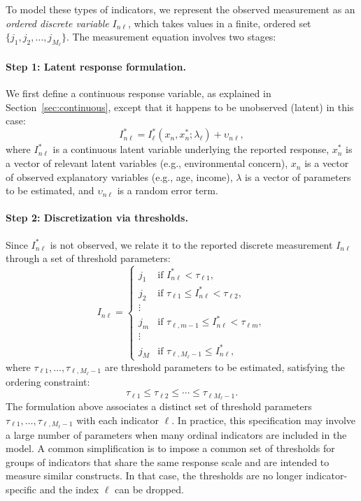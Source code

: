 \documentclass[12pt,a4paper]{article}
\begin{document}
To model these types of indicators, we represent the observed
measurement as an \emph{ordered discrete variable} $I_{n\ell}$, which
takes values in a finite, ordered set $\{j_1, j_2, \ldots,
j_{M_\ell}\}$. The measurement equation involves two stages:

\paragraph{Step 1: Latent response formulation.} We first define a continuous response variable, as explained in Section~\ref{sec:continuous}, except that it happens to be unobserved (latent) in this case:
\begin{equation}
I^*_{n\ell} = I^*_\ell(x_n, x_n^*; \lambda_\ell) + \upsilon_{n\ell},
\end{equation}
where $I^*_{n\ell}$ is a continuous latent variable underlying the
reported response, $x_n^*$ is a vector of relevant latent variables
(e.g., environmental concern), $x_n$ is a vector of observed
explanatory variables (e.g., age, income), $\lambda$ is a vector of
parameters to be estimated, and $\upsilon_{n\ell}$ is a random error
term.

\paragraph{Step 2: Discretization via thresholds.} Since $I^*_{n\ell}$ is not observed, we relate it to the reported discrete measurement $I_{n\ell}$ through a set of threshold parameters:
\begin{equation}
\label{eq:discreteMeas-b}
I_{n\ell} = \left\{
\begin{array}{ll}
j_1 & \text{if } I^*_{n\ell} < \tau_{\ell 1}, \\ j_2 & \text{if }
\tau_{\ell 1} \leq I^*_{n\ell} < \tau_{\ell 2}, \\ \vdots \\ j_m &
\text{if } \tau_{\ell, m-1} \leq I^*_{n\ell} < \tau_{\ell m},
\\ \vdots \\ j_M & \text{if } \tau_{\ell, M_\ell-1} \leq I^*_{n\ell},
\end{array}
\right.
\end{equation}
where $\tau_{\ell 1}, \ldots, \tau_{\ell, M_\ell-1}$ are threshold
parameters to be estimated, satisfying the ordering constraint:
\begin{equation}
\label{eq:discreteMeas-c}
\tau_{\ell 1} \leq \tau_{\ell 2} \leq \cdots \leq \tau_{\ell
  M_\ell-1}.
\end{equation}
The formulation above associates a distinct set of threshold
parameters $\tau_{\ell 1}, \ldots, \tau_{\ell,M_\ell-1}$ with each
indicator $\ell$. In practice, this specification may involve a large
number of parameters when many ordinal indicators are included in the
model. A common simplification is to impose a common set of thresholds
for groups of indicators that share the same response scale and are
intended to measure similar constructs. In that case, the thresholds
are no longer indicator-specific and the index $\ell$ can be dropped.
\end{document}
